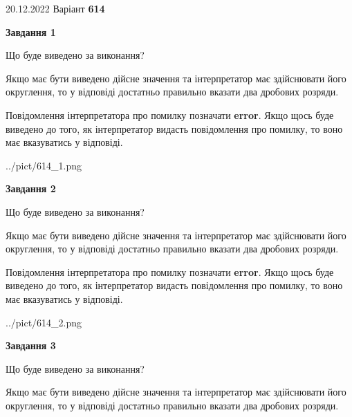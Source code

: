 \documentclass[12pt, ukrainian]{article}
\begin{document}
{20.12.2022 Варіант \No \textbf { 614 }\par}
{
\begin {Large}

{\begin {center}\textbf{Завдання 1}\end {center}}\par
Що буде виведено за виконання? \par

Якщо має бути виведено дійсне значення та інтерпретатор має здійснювати його округлення, 
то у відповіді достатньо правильно вказати два дробових розряди.

Повідомлення інтерпретатора про помилку позначати \textbf{error}.
Якщо щось буде виведено до того, як інтерпретатор видасть повідомлення про помилку, 
то воно має вказуватись у відповіді. \par

\begin{center}
	{../pict/614_1.png}
\end{center}
\newpage

{\begin {center}\textbf{Завдання 2}\end {center}}\par
Що буде виведено за виконання? \par

Якщо має бути виведено дійсне значення та інтерпретатор має здійснювати його округлення, 
то у відповіді достатньо правильно вказати два дробових розряди.

Повідомлення інтерпретатора про помилку позначати \textbf{error}.
Якщо щось буде виведено до того, як інтерпретатор видасть повідомлення про помилку, 
то воно має вказуватись у відповіді. \par

\begin{center}
	{../pict/614_2.png}
\end{center}
\newpage

{\begin {center}\textbf{Завдання 3}\end {center}}\par
Що буде виведено за виконання? \par

Якщо має бути виведено дійсне значення та інтерпретатор має здійснювати його округлення, 
то у відповіді достатньо правильно вказати два дробових розряди.


\end{Large}}
\end{document}
